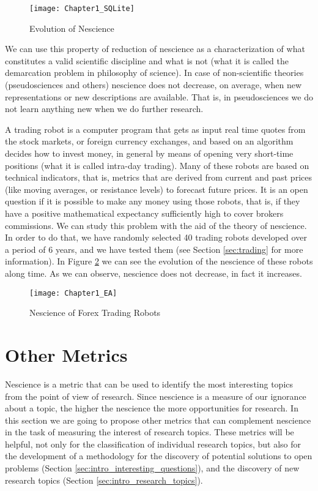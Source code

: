 \begin{figure}[h]
\centering\texttt{[image: Chapter1\_SQLite]}
\caption{\label{fig:Chapter1_SQLite}Evolution of Nescience}
\end{figure}

We can use this property of reduction of nescience as a characterization of what constitutes a valid scientific discipline and what is not (what it is called the demarcation problem in philosophy of science). In case of non-scientific theories (pseudosciences and others) nescience does not decrease, on average, when new representations or new descriptions are available. That is, in pseudosciences we do not learn anything new when we do further research.

\begin{example}
A trading robot is a computer program that gets as input real time quotes from the stock markets, or foreign currency exchanges, and based on an algorithm decides how to invest money, in general by means of opening very short-time positions (what it is called intra-day trading). Many of these robots are based on technical indicators, that is, metrics that are derived from current and past prices (like moving averages, or resistance levels) to forecast future prices. It is an open question if it is possible to make any money using those robots, that is, if they have a positive mathematical expectancy sufficiently high to cover brokers commissions. We can study this problem with the aid of the theory of nescience. In order to do that, we have randomly selected 40 trading robots developed over a period of 6 years, and we have tested them (see Section \ref{sec:trading} for more information). In Figure \ref{fig:Chapter1_EA} we can see the evolution of the nescience of these robots along time. As we can observe, nescience does not decrease, in fact it increases.
\end{example}

\begin{figure}[h]
\centering\texttt{[image: Chapter1\_EA]}
\caption{\label{fig:Chapter1_EA}Nescience of Forex Trading Robots}
\end{figure}

%
%

\section{Other Metrics}

Nescience is a metric that can be used to identify the most interesting topics from the point of view of research. Since nescience is a measure of our ignorance about a topic, the higher the nescience the more opportunities for research. In this section we are going to propose other metrics that can complement nescience in the task of measuring the interest of research topics. These metrics will be helpful, not only for the classification of individual research topics, but also for the development of a methodology for the discovery of potential solutions to open problems (Section \ref{sec:intro_interesting_questions}), and the discovery of new research topics (Section \ref{sec:intro_research_topics}).

